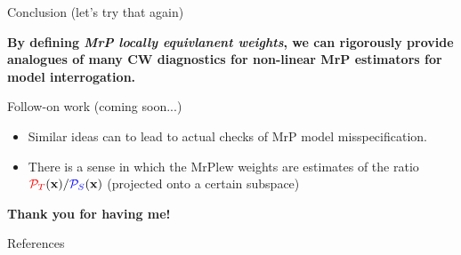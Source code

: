 \begin{frame}[c]{Conclusion (let's try that again)}

\textbf{
By defining \textit{MrP locally equivlanent weights}, we can rigorously provide
analogues of many CW diagnostics for non-linear MrP estimators for model interrogation.\\[1em]
}

Follow-on work (coming soon...)
%
\begin{itemize}
\item Similar ideas can to lead to actual checks of MrP model misspecification.
\item There is a sense in which the MrPlew weights are estimates of the ratio $\textcolor{red}{\mathcal{P}_{T}}(\mathbf{x}) / \textcolor{blue}{{\mathcal{P}_{S}}}(\mathbf{x})$
  (projected onto a certain subspace)
\end{itemize}
%




\begin{center}
\textbf{Thank you for having me!}
\end{center}

\end{frame}


\begin{frame}[allowframebreaks]{References}


\renewcommand*{\bibfont}{\normalfont\tiny}
\printbibliography[heading=none]

\end{frame}



